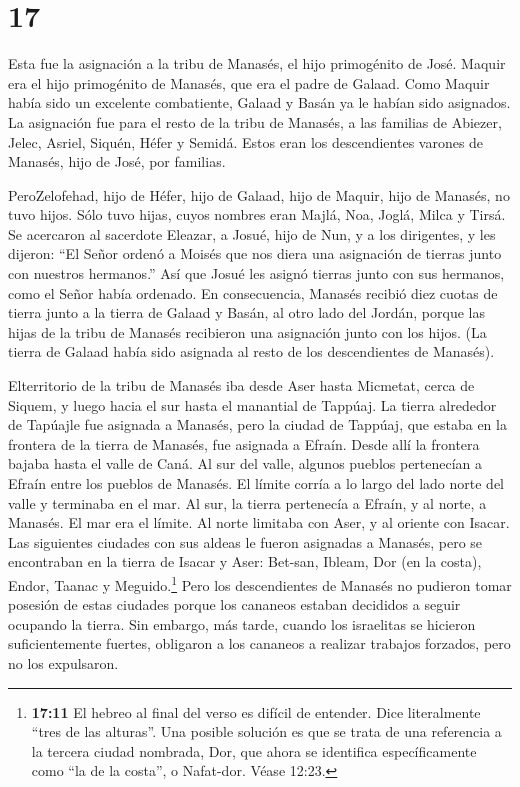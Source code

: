 \hypertarget{section-16}{%
\section{17}\label{section-16}}

 Esta fue la asignación a la tribu de Manasés, el hijo
primogénito de José. Maquir era el hijo primogénito de Manasés, que era
el padre de Galaad. Como Maquir había sido un excelente combatiente,
Galaad y Basán ya le habían sido asignados.  La asignación
fue para el resto de la tribu de Manasés, a las familias de Abiezer,
Jelec, Asriel, Siquén, Héfer y Semidá. Estos eran los descendientes
varones de Manasés, hijo de José, por familias.

 PeroZelofehad, hijo de Héfer, hijo de Galaad, hijo de
Maquir, hijo de Manasés, no tuvo hijos. Sólo tuvo hijas, cuyos nombres
eran Majlá, Noa, Joglá, Milca y Tirsá.  Se acercaron al
sacerdote Eleazar, a Josué, hijo de Nun, y a los dirigentes, y les
dijeron: ``El Señor ordenó a Moisés que nos diera una asignación de
tierras junto con nuestros hermanos.'' Así que Josué les asignó tierras
junto con sus hermanos, como el Señor había ordenado.  En
consecuencia, Manasés recibió diez cuotas de tierra junto a la tierra de
Galaad y Basán, al otro lado del Jordán,  porque las hijas
de la tribu de Manasés recibieron una asignación junto con los hijos.
(La tierra de Galaad había sido asignada al resto de los descendientes
de Manasés).

 Elterritorio de la tribu de Manasés iba desde Aser hasta
Micmetat, cerca de Siquem, y luego hacia el sur hasta el manantial de
Tappúaj.  La tierra alrededor de Tapúajle fue asignada a
Manasés, pero la ciudad de Tappúaj, que estaba en la frontera de la
tierra de Manasés, fue asignada a Efraín.  Desde allí la
frontera bajaba hasta el valle de Caná. Al sur del valle, algunos
pueblos pertenecían a Efraín entre los pueblos de Manasés. El límite
corría a lo largo del lado norte del valle y terminaba en el mar.
 Al sur, la tierra pertenecía a Efraín, y al norte, a
Manasés. El mar era el límite. Al norte limitaba con Aser, y al oriente
con Isacar.  Las siguientes ciudades con sus aldeas le
fueron asignadas a Manasés, pero se encontraban en la tierra de Isacar y
Aser: Bet-san, Ibleam, Dor (en la costa), Endor, Taanac y
Meguido.\footnote{\textbf{17:11} El hebreo al final del verso es difícil
  de entender. Dice literalmente ``tres de las alturas''. Una posible
  solución es que se trata de una referencia a la tercera ciudad
  nombrada, Dor, que ahora se identifica específicamente como ``la de la
  costa'', o Nafat-dor. Véase 12:23.}  Pero los
descendientes de Manasés no pudieron tomar posesión de estas ciudades
porque los cananeos estaban decididos a seguir ocupando la tierra.
 Sin embargo, más tarde, cuando los israelitas se hicieron
suficientemente fuertes, obligaron a los cananeos a realizar trabajos
forzados, pero no los expulsaron.

